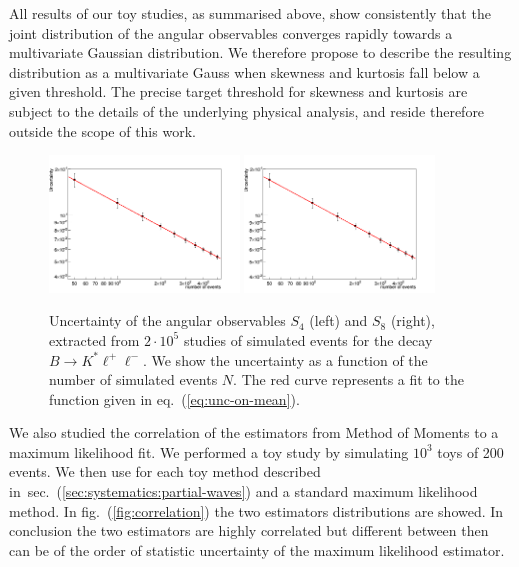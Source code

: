 \documentclass[aps,prd,reprint,nofootinbib,preprintnumbers]{revtex4}
\newcommand{\refeq}[1]{eq.~(\ref{eq:#1})}
\newcommand{\reffig}[1]{fig.~(\ref{fig:#1})}
\newcommand{\refsec}[1]{sec.~(\ref{sec:#1})}
\begin{document}
All results of our toy studies, as summarised above, show consistently that the joint distribution of the angular
observables converges rapidly towards a multivariate Gaussian distribution. We therefore propose to describe the
resulting distribution as a multivariate Gauss when skewness and kurtosis fall below a given threshold.
The precise target threshold for skewness and kurtosis are subject to the details of the underlying physical analysis,
and reside therefore outside the scope of this work.


\begin{figure}[t]
        \centering
            \includegraphics[width=0.45\textwidth]{figs/Q2_1_2_S4.png}
            \includegraphics[width=0.45\textwidth]{figs/Q2_1_2_S8.png}
        \caption{Uncertainty of the angular observables $S_4$ (left) and $S_8$ (right), extracted from $2\cdot 10^5$ studies of
        simulated events for the decay $B\to K^*\ell^+\ell^-$. We show the uncertainty as a function of the number of simulated events $N$.
        The red curve represents a fit to the function given in \refeq{unc-on-mean}.}
        \label{fig:errors}
\end{figure}


We also studied the correlation of the estimators from Method of Moments to a maximum likelihood fit. We performed a toy study by simulating $10^3$ toys of 200 events. We then use for each toy method described in~\refsec{systematics:partial-waves} and a standard maximum likelihood method. In \reffig{correlation} the two estimators distributions are showed. In conclusion the two estimators are highly correlated but different between then can be of the order of statistic uncertainty of the maximum likelihood estimator.
\end{document}
